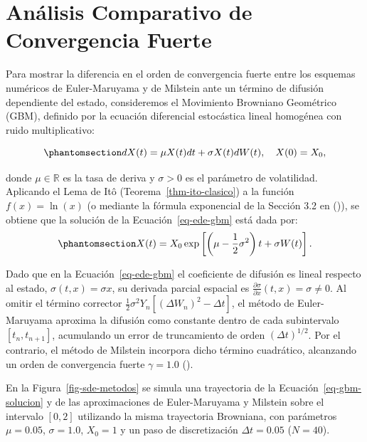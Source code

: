 \documentclass[
  spanish,
  us-letterpaper,
]{scrreprt}
\numberwithin{equation}{section}
\theoremstyle{plain}
\theoremstyle{plain}
\theoremstyle{definition}
\theoremstyle{plain}
\theoremstyle{remark}
\begin{document}
\section{Análisis Comparativo de Convergencia
Fuerte}\label{anuxe1lisis-comparativo-de-convergencia-fuerte}

Para mostrar la diferencia en el orden de convergencia fuerte entre los
esquemas numéricos de Euler-Maruyama y de Milstein ante un término de
difusión dependiente del estado, consideremos el Movimiento Browniano
Geométrico (GBM), definido por la ecuación diferencial estocástica
lineal homogénea con ruido multiplicativo:

\begin{equation}\phantomsection\label{eq-ede-gbm}{
dX(t) = \mu X(t) dt + \sigma X(t) dW(t), \quad X(0) = X_0,
}\end{equation}

donde \(\mu \in \mathbb{R}\) es la tasa de deriva y \(\sigma > 0\) es el
parámetro de volatilidad. Aplicando el Lema de Itô
(Teorema~\ref{thm-ito-clasico}) a la función \(f(x) = \ln(x)\) (o
mediante la fórmula exponencial de la Sección 3.2 en
()), se obtiene que la solución
de la Ecuación~\ref{eq-ede-gbm} está dada por:
\begin{equation}\phantomsection\label{eq-gbm-solucion}{
X(t) = X_0 \exp\left[ \left( \mu - \frac{1}{2}\sigma^2 \right)t + \sigma W(t) \right].
}\end{equation}

Dado que en la Ecuación~\ref{eq-ede-gbm} el coeficiente de difusión es
lineal respecto al estado, \(\sigma(t, x) = \sigma x\), su derivada
parcial espacial es
\(\displaystyle \frac{\partial \sigma}{\partial x}(t, x) = \sigma \neq 0\).
Al omitir el término corrector
\(\frac{1}{2}\sigma^2 Y_n [(\Delta W_n)^2 - \Delta t]\), el método de
Euler-Maruyama aproxima la difusión como constante dentro de cada
subintervalo \([t_n, t_{n+1}]\), acumulando un error de truncamiento de
orden \((\Delta t)^{1/2}\). Por el contrario, el método de Milstein
incorpora dicho término cuadrático, alcanzando un orden de convergencia
fuerte \(\gamma = 1.0\) ().

En la Figura~\ref{fig-sde-metodos} se simula una trayectoria de la
Ecuación~\ref{eq-gbm-solucion} y de las aproximaciones de Euler-Maruyama
y Milstein sobre el intervalo \([0, 2]\) utilizando la misma trayectoria
Browniana, con parámetros \(\mu = 0.05\), \(\sigma = 1.0\), \(X_0 = 1\)
y un paso de discretización \(\Delta t = 0.05\) (\(N = 40\)).
\end{document}
